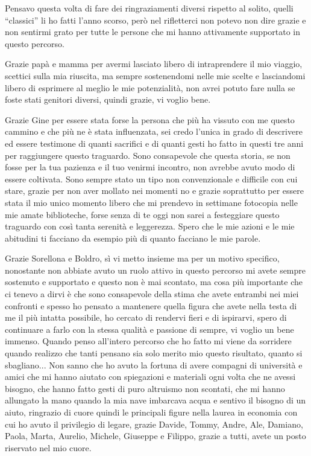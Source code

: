 \documentclass[12pt, a4paper]{report}
\begin{document}
Pensavo questa volta di fare dei ringraziamenti diversi rispetto al solito, quelli ``classici'' li ho fatti l'anno scorso, però nel rifletterci non potevo non dire grazie e non sentirmi grato per tutte le persone che mi hanno attivamente supportato in questo percorso.
\par
\vspace{\baselineskip}
Grazie papà e mamma per avermi lasciato libero di intraprendere il mio viaggio, scettici sulla mia riuscita, ma sempre sostenendomi nelle mie scelte e lasciandomi libero di esprimere al meglio le mie potenzialità, non avrei potuto fare nulla se foste stati genitori diversi, quindi grazie, vi voglio bene.
\par
\vspace{\baselineskip}
Grazie Gine per essere stata forse la persona che più ha vissuto con me questo cammino e che più ne è stata influenzata, sei credo l'unica in grado di descrivere ed essere testimone di quanti sacrifici e di quanti gesti ho fatto in questi tre anni per raggiungere questo traguardo. Sono consapevole che questa storia, se non fosse per la tua pazienza e il tuo venirmi incontro, non avrebbe avuto modo di essere coltivata. Sono sempre stato un tipo non convenzionale e difficile con cui stare, grazie per non aver mollato nei momenti no e grazie soprattutto per essere stata il mio unico momento libero che mi prendevo in settimane fotocopia nelle mie amate biblioteche, forse senza di te oggi non sarei a festeggiare questo traguardo con così tanta serenità e leggerezza. Spero che le mie azioni e le mie abitudini ti facciano da esempio più di quanto facciano le mie parole.
\par
\vspace{\baselineskip}
Grazie Sorellona e Boldro, sì vi metto insieme ma per un motivo specifico, nonostante non abbiate avuto un ruolo attivo in questo percorso mi avete sempre sostenuto e supportato e questo non è mai scontato, ma cosa più importante che ci tenevo a dirvi è che sono consapevole della stima che avete entrambi nei miei confronti e spesso ho pensato a mantenere quella figura che avete nella testa di me il più intatta possibile, ho cercato di rendervi fieri e di ispirarvi, spero di continuare a farlo con la stessa qualità e passione di sempre, vi voglio un bene immenso.
\newpage
Quando penso all'intero percorso che ho fatto mi viene da sorridere quando realizzo che tanti pensano sia solo merito mio questo risultato, quanto si sbagliano... Non sanno che ho avuto la fortuna di avere compagni di università e amici che mi hanno aiutato con spiegazioni e materiali ogni volta che ne avessi bisogno, che hanno fatto gesti di puro altruismo non scontati, che mi hanno allungato la mano quando la mia nave imbarcava acqua e sentivo il bisogno di un aiuto, ringrazio di cuore quindi le principali figure nella laurea in economia con cui ho avuto il privilegio di legare, grazie Davide, Tommy, Andre, Ale, Damiano, Paola, Marta, Aurelio, Michele, Giuseppe e Filippo, grazie a tutti, avete un posto riservato nel mio cuore.
\end{document}
